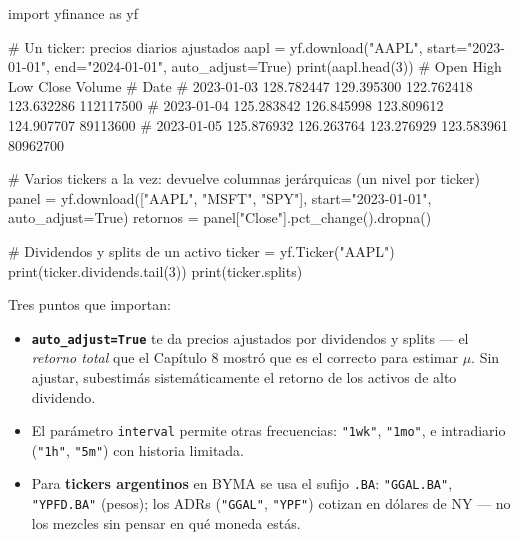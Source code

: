 \documentclass[
  spanish,
  letterpaper,
  DIV=11,
  numbers=noendperiod]{scrreprt}
\newenvironment{Shaded}{\begin{snugshade}}{\end{snugshade}}
\newcommand{\BuiltInTok}[1]{\textcolor[rgb]{0.00,0.23,0.31}{#1}}
\newcommand{\CommentTok}[1]{\textcolor[rgb]{0.37,0.37,0.37}{#1}}
\newcommand{\DecValTok}[1]{\textcolor[rgb]{0.68,0.00,0.00}{#1}}
\newcommand{\ImportTok}[1]{\textcolor[rgb]{0.00,0.46,0.62}{#1}}
\newcommand{\NormalTok}[1]{\textcolor[rgb]{0.00,0.23,0.31}{#1}}
\newcommand{\OperatorTok}[1]{\textcolor[rgb]{0.37,0.37,0.37}{#1}}
\newcommand{\StringTok}[1]{\textcolor[rgb]{0.13,0.47,0.30}{#1}}
\newcommand{\VariableTok}[1]{\textcolor[rgb]{0.07,0.07,0.07}{#1}}
\providecommand{\tightlist}{%
  \setlength{\itemsep}{0pt}\setlength{\parskip}{0pt}}
\begin{document}
\begin{Shaded}
\begin{Highlighting}[]
\ImportTok{import}\NormalTok{ yfinance }\ImportTok{as}\NormalTok{ yf}

\CommentTok{\# Un ticker: precios diarios ajustados}
\NormalTok{aapl }\OperatorTok{=}\NormalTok{ yf.download(}\StringTok{"AAPL"}\NormalTok{, start}\OperatorTok{=}\StringTok{"2023{-}01{-}01"}\NormalTok{, end}\OperatorTok{=}\StringTok{"2024{-}01{-}01"}\NormalTok{, auto\_adjust}\OperatorTok{=}\VariableTok{True}\NormalTok{)}
\BuiltInTok{print}\NormalTok{(aapl.head(}\DecValTok{3}\NormalTok{))}
\CommentTok{\#                   Open        High         Low       Close    Volume}
\CommentTok{\# Date}
\CommentTok{\# 2023{-}01{-}03  128.782447  129.395300  122.762418  123.632286  112117500}
\CommentTok{\# 2023{-}01{-}04  125.283842  126.845998  123.809612  124.907707   89113600}
\CommentTok{\# 2023{-}01{-}05  125.876932  126.263764  123.276929  123.583961   80962700}

\CommentTok{\# Varios tickers a la vez: devuelve columnas jerárquicas (un nivel por ticker)}
\NormalTok{panel }\OperatorTok{=}\NormalTok{ yf.download([}\StringTok{"AAPL"}\NormalTok{, }\StringTok{"MSFT"}\NormalTok{, }\StringTok{"SPY"}\NormalTok{], start}\OperatorTok{=}\StringTok{"2023{-}01{-}01"}\NormalTok{, auto\_adjust}\OperatorTok{=}\VariableTok{True}\NormalTok{)}
\NormalTok{retornos }\OperatorTok{=}\NormalTok{ panel[}\StringTok{"Close"}\NormalTok{].pct\_change().dropna()}

\CommentTok{\# Dividendos y splits de un activo}
\NormalTok{ticker }\OperatorTok{=}\NormalTok{ yf.Ticker(}\StringTok{"AAPL"}\NormalTok{)}
\BuiltInTok{print}\NormalTok{(ticker.dividends.tail(}\DecValTok{3}\NormalTok{))}
\BuiltInTok{print}\NormalTok{(ticker.splits)}
\end{Highlighting}
\end{Shaded}

Tres puntos que importan:

\begin{itemize}
\tightlist
\item
  \textbf{\texttt{auto\_adjust=True}} te da precios ajustados por
  dividendos y splits --- el \emph{retorno total} que el Capítulo 8
  mostró que es el correcto para estimar \(\mu\). Sin ajustar,
  subestimás sistemáticamente el retorno de los activos de alto
  dividendo.
\item
  El parámetro \texttt{interval} permite otras frecuencias:
  \texttt{"1wk"}, \texttt{"1mo"}, e intradiario (\texttt{"1h"},
  \texttt{"5m"}) con historia limitada.
\item
  Para \textbf{tickers argentinos} en BYMA se usa el sufijo
  \texttt{.BA}: \texttt{"GGAL.BA"}, \texttt{"YPFD.BA"} (pesos); los ADRs
  (\texttt{"GGAL"}, \texttt{"YPF"}) cotizan en dólares de NY --- no los
  mezcles sin pensar en qué moneda estás.
\end{itemize}
\end{document}
